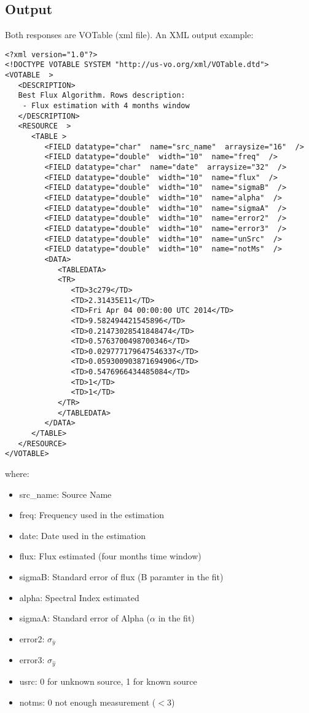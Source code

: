 \documentclass[10pt]{article}
\begin{document}
\subsection{Output}
\noindent Both responses are VOTable (xml file). An XML output example:
\lstset{language=XML}
\begin{lstlisting}
<?xml version="1.0"?>
<!DOCTYPE VOTABLE SYSTEM "http://us-vo.org/xml/VOTable.dtd">
<VOTABLE  >
   <DESCRIPTION>
   Best Flux Algorithm. Rows description: 
    - Flux estimation with 4 months window
   </DESCRIPTION>
   <RESOURCE  >
      <TABLE >
         <FIELD datatype="char"  name="src_name"  arraysize="16"  />
         <FIELD datatype="double"  width="10"  name="freq"  />
         <FIELD datatype="char"  name="date"  arraysize="32"  />
         <FIELD datatype="double"  width="10"  name="flux"  />
         <FIELD datatype="double"  width="10"  name="sigmaB"  />
         <FIELD datatype="double"  width="10"  name="alpha"  />
         <FIELD datatype="double"  width="10"  name="sigmaA"  />
         <FIELD datatype="double"  width="10"  name="error2"  />
         <FIELD datatype="double"  width="10"  name="error3"  />
         <FIELD datatype="double"  width="10"  name="unSrc"  />
         <FIELD datatype="double"  width="10"  name="notMs"  />
         <DATA>
            <TABLEDATA>
            <TR>
               <TD>3c279</TD>
               <TD>2.31435E11</TD>
               <TD>Fri Apr 04 00:00:00 UTC 2014</TD>
               <TD>9.582494421545896</TD>
               <TD>0.21473028541848474</TD>
               <TD>0.5763700498700346</TD>
               <TD>0.029777179647546337</TD>
               <TD>0.059300903871694906</TD>
               <TD>0.5476966434485084</TD>
               <TD>1</TD>
               <TD>1</TD>
            </TR>
            </TABLEDATA>
         </DATA>
      </TABLE>
   </RESOURCE>
</VOTABLE>
\end{lstlisting}

\noindent where:
\begin{itemize}
    \item src\_name: Source Name
    \item freq: Frequency used in the estimation
    \item date: Date used in the estimation
    \item flux: Flux estimated (four months time window)
    \item sigmaB: Standard error of flux (B paramter in the fit)
    \item alpha: Spectral Index estimated
    \item sigmaA: Standard error of Alpha ($\alpha$ in the fit)
    \item error2: $\sigma_{\bar{y}}$ %
    \item error3: $\sigma_{\hat{y}}$
    \item usrc: 0 for unknown source, 1 for known source
    \item notms: 0 not enough measurement ($<$3)
\end{itemize}
\end{document}
